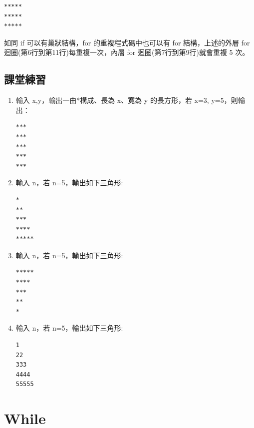 \documentclass[a4paper,12pt]{article}
\begin{document}
\begin{verbatim}
*****
*****
*****
\end{verbatim}


如同 if 可以有巢狀結構，for 的重複程式碼中也可以有 for 結構，上述的外層 for 迴圈(第6行到第11行)每重複一次，內層 for 迴圈(第7行到第9行)就會重複 5 次。\\
\subsection{課堂練習}
\label{sec:org4f41abd}
\begin{enumerate}
\item 輸入 x,y，輸出一由*構成、長為 x、寛為 y 的長方形，若 x=3, y=5，則輸出：
\label{sec:org2240be2}
\begin{verbatim}
***
***
***
***
***
\end{verbatim}
\item 輸入 n，若 n=5，輸出如下三角形:
\label{sec:org5f99f43}
\begin{verbatim}
*
**
***
****
*****
\end{verbatim}
\item 輸入 n，若 n=5，輸出如下三角形:
\label{sec:org66c1f62}
\begin{verbatim}
*****
****
***
**
*
\end{verbatim}
\item 輸入 n，若 n=5，輸出如下三角形:
\label{sec:orge0a4490}
\begin{verbatim}
1
22
333
4444
55555
\end{verbatim}
\end{enumerate}

\section{While}
\label{cpp_while}
\end{document}
